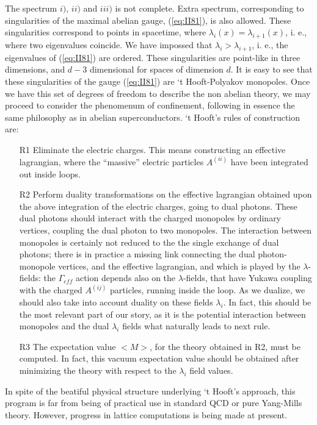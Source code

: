 The spectrum $i)$, $ii)$ and $iii)$ is not complete. Extra
spectrum, corresponding to singularities of the maximal abelian
gauge, (\ref{eq:II81}), is also allowed. These singularities
correspond to points in spacetime, where
$\lambda_i(x)=\lambda_{i+1}(x)$, i. e., where two eigenvalues
coincide. We have impossed that $\lambda_i>\lambda_{i+1}$, i. e.,
the eigenvalues of (\ref{eq:II81}) are ordered. These
singularities are point-like in three dimensions, and $d-3$
dimensional for spaces of dimension $d$. It is easy to see that 
these singularities of the gauge (\ref{eq:II81}) are 
`t Hooft-Polyakov monopoles. Once we have this set of degrees of
freedom to describe the non abelian theory, we may proceed to
consider the phenomenum of confinement, following in essence the
same philosophy as in abelian superconductors. `t Hooft's rules
of construction are:
\begin{itemize}
	\item[{R1}] Eliminate the electric charges. This
means constructing an effective lagrangian, where the
``massive'' electric particles $A^{(ii)}$ have been integrated
out inside loops.
	\item[{R2}] Perform duality transformations on the
effective lagrangian obtained upon the above integration of the
electric charges, going to dual photons. These dual photons
should interact with the charged monopoles by ordinary vertices,
coupling the dual photon to two monopoles. The interaction
between monopoles is certainly not reduced to the the single
exchange of dual photons; there is in practice a missing link
connecting the dual photon-monopole vertices, and the effective
lagrangian, and which is played by the $\lambda$-fields: the
$\Gamma_{eff}$ action depends also on the $\lambda$-fields, that
have Yukawa coupling with the charged $A^{(ij)}$ particles,
running inside the loop. As we dualize, we should also take into
account duality on these fields $\lambda_i$. In fact, this should
be the most relevant part of our story, as it is the potential
interaction between monopoles and the dual $\lambda_i$ fields
what naturally leads to next rule.
	\item[{R3}] The expectation value $<M>$, for the theory
obtained in R2, must be computed. In fact, this vacuum
expectation value should be obtained after minimizing the theory
with respect to the $\lambda_i$ field values.
\end{itemize}
  
In spite of the beatiful physical structure underlying `t Hooft's
approach, this program is far from being of practical use in
standard QCD or pure Yang-Mills theory. However, progress in
lattice computations is being made at present.
  
